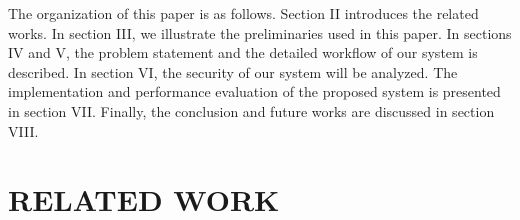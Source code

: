 \documentclass[journal,10pt]{IEEEtran}
\begin{document}
The organization of this paper is as follows. Section II introduces the related works. In section III, we illustrate the preliminaries used in this paper. In sections IV and V, the problem statement and the detailed workflow of our system is described. In section VI, the security of our system will be analyzed. The implementation and performance evaluation of the proposed system is presented in section VII. Finally, the conclusion and future works are discussed in section VIII.


\section{RELATED WORK}
\end{document}
